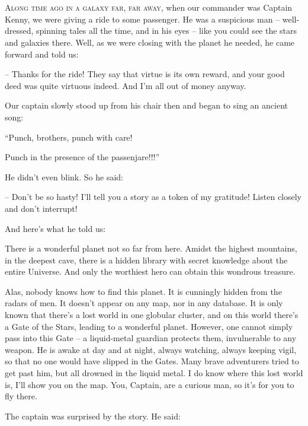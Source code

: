 \documentclass[ebook,oneside,final,openright]{memoir}
\begin{document}
\chapter{}
\par
\lettrine{A}{long time ago in a galaxy far, far away,} when our commander was Captain Kenny, we were giving a ride to some passenger. He was a suspicious man – well-dressed, spinning tales all the time, and in his eyes – like you could see the stars and galaxies there. Well, as we were closing with the planet he needed, he came forward and told us: \par
\par
– Thanks for the ride! They say that virtue is its own reward, and your good deed was quite virtuous indeed. And I’m all out of money anyway.\par
Our captain slowly stood up from his chair then and began to sing an ancient song: \par
“Punch, brothers, punch with care! \par
 Punch in the presence of the passenjare!!!” \par
He didn’t even blink. So he said:\par
– Don’t be so hasty! I’ll tell you a story as a token of my gratitude! Listen closely and don’t interrupt! \par
 And here’s what he told us:\par
\par
 There is a wonderful planet not so far from here. Amidst the highest mountains, in the deepest cave, there is a hidden library with secret knowledge about the entire Universe. And only the worthiest hero can obtain this wondrous treasure. \par
Alas, nobody knows how to find this planet. It is cunningly hidden from the radars of men. It doesn’t appear on any map, nor in any database. It is only known that there’s a lost world in one globular cluster, and on this world there’s a Gate of the Stars, leading to a wonderful planet. However, one cannot simply pass into this Gate – a liquid-metal guardian protects them, invulnerable to any weapon. He is awake at day and at night, always watching, always keeping vigil, so that no one would have slipped in the Gates. Many brave adventurers tried to get past him, but all drowned in the liquid metal. I do know where this lost world is, I’ll show you on the map. You, Captain, are a curious man, so it’s for you to fly there.\par
\par
The captain was surprised by the story. He said:\par
\end{document}
